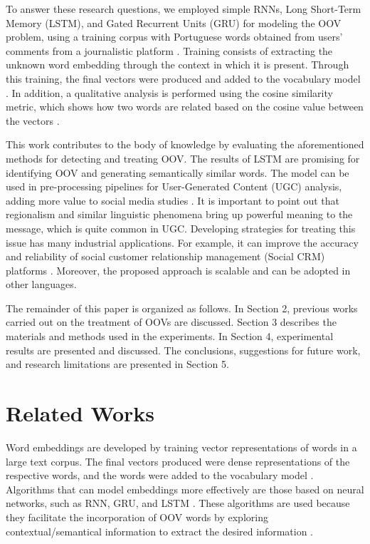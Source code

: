 \documentclass[conference]{IEEEtran}
\begin{document}
To answer these research questions, we employed simple RNNs, Long Short-Term Memory (LSTM), and Gated Recurrent Units (GRU) for modeling the OOV problem, using a training corpus with Portuguese words obtained from users' comments from a journalistic platform . Training consists of extracting the unknown word embedding through the context in which it is present. Through this training, the final vectors were produced and added to the vocabulary model \cite{b7}. In addition, a qualitative analysis is performed using the cosine similarity metric, which shows how two words are related based on the cosine value between the vectors \cite{b8,b9}.

This work contributes to the body of knowledge by evaluating the aforementioned methods for detecting and treating OOV. The results of LSTM are promising for identifying OOV and generating semantically similar words. The model can be used in pre-processing pipelines for User-Generated Content (UGC) analysis, adding more value to social media studies \cite{b21}. It is important to point out that regionalism and similar linguistic phenomena bring up powerful meaning to the message, which is quite common in UGC. Developing strategies for treating this issue has many industrial applications. For example, it can improve the accuracy and reliability of social customer relationship management (Social CRM) platforms \cite{b22,b21}. Moreover, the proposed approach is scalable and can be adopted in other languages.

The remainder of this paper is organized as follows. In Section 2, previous works carried out on the treatment of OOVs are discussed. Section 3 describes the materials and methods used in the experiments. In Section 4, experimental results are presented and discussed. The conclusions, suggestions for future work, and research limitations are presented in Section 5.

\section{Related Works}
Word embeddings are developed by training vector representations of words in a large text corpus. The final vectors produced were dense representations of the respective words, and the words were added to the vocabulary model \cite{b7}. Algorithms that can model embeddings more effectively are those based on neural networks, such as RNN, GRU, and LSTM \cite{b6}. These algorithms are used because they facilitate the incorporation of OOV words by exploring contextual/semantical information to extract the desired information \cite{b14}.
\end{document}
